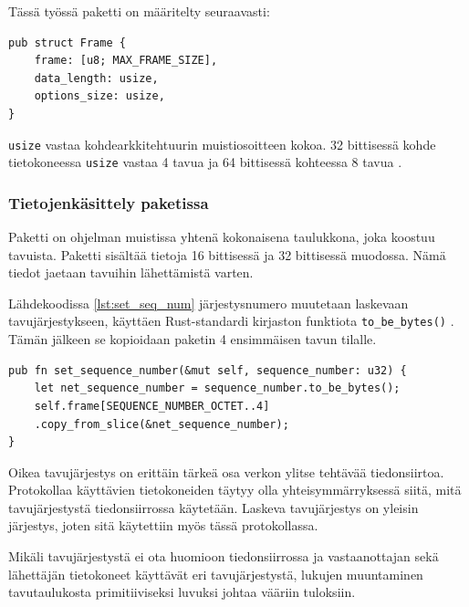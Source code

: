 \documentclass[a4paper,12pt]{article}
\begin{document}
    Tässä työssä paketti on määritelty seuraavasti:
    \begin{lstlisting}[caption={Paketin rakenne}, label={lst:frame}]
pub struct Frame {
    frame: [u8; MAX_FRAME_SIZE],
    data_length: usize,
    options_size: usize,
}\end{lstlisting}


    
   \begin{framed}
        \lstinline{usize} vastaa kohdearkkitehtuurin muistiosoitteen kokoa. 32 bittisessä kohde tietokoneessa \lstinline{usize} vastaa 4 tavua ja 64 bittisessä kohteessa 8 tavua \cite{rust-doc-usize}.
   \end{framed} 
   
    \subsubsection{Tietojenkäsittely paketissa}
    Paketti on ohjelman muistissa yhtenä kokonaisena taulukkona, joka koostuu tavuista.
    Paketti sisältää tietoja 16 bittisessä ja 32 bittisessä muodossa. Nämä tiedot jaetaan tavuihin lähettämistä varten.

    Lähdekoodissa \ref{lst:set_seq_num} järjestysnumero muutetaan laskevaan tavujärjestykseen, käyttäen Rust-standardi kirjaston funktiota \lstinline{to_be_bytes()} \cite{rust_doc_u32}. Tämän jälkeen se kopioidaan paketin 4 ensimmäisen tavun tilalle. \par
    
        \begin{lstlisting}[caption={Järjestysnumeron asettaminen pakettiin}, label={lst:set_seq_num}]
pub fn set_sequence_number(&mut self, sequence_number: u32) {
    let net_sequence_number = sequence_number.to_be_bytes();
    self.frame[SEQUENCE_NUMBER_OCTET..4]
    .copy_from_slice(&net_sequence_number);
}\end{lstlisting}


    Oikea tavujärjestys on erittäin tärkeä osa verkon ylitse tehtävää tiedonsiirtoa. Protokollaa käyttävien tietokoneiden täytyy olla yhteisymmärryksessä siitä, mitä tavujärjestystä tiedonsiirrossa käytetään. Laskeva tavujärjestys on yleisin järjestys, joten sitä käytettiin myös tässä protokollassa. \par
    
    Mikäli tavujärjestystä ei ota huomioon tiedonsiirrossa ja vastaanottajan sekä lähettäjän tietokoneet käyttävät eri tavujärjestystä, lukujen muuntaminen tavutaulukosta primitiiviseksi luvuksi johtaa vääriin tuloksiin.
    \cite{Adiga2007HowC}
\end{document}
